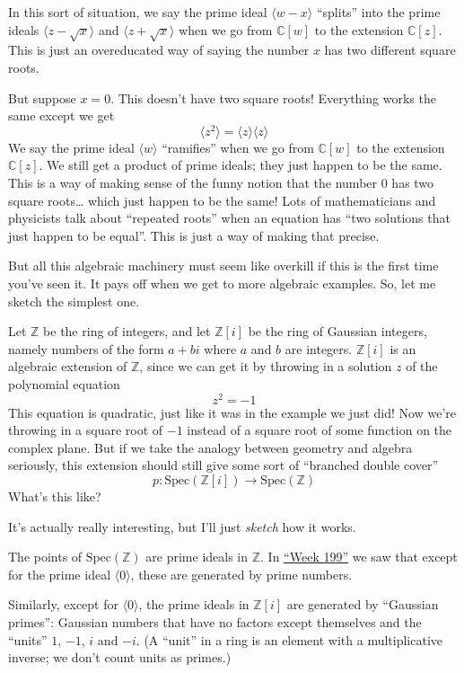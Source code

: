 \documentclass{article}
\begin{document}
In this sort of situation, we say the prime ideal
\(\langle w - x\rangle\) ``splits'' into the prime ideals
\(\langle z - \sqrt{x}\rangle\) and \(\langle z + \sqrt{x}\rangle\) when
we go from \(\mathbb{C}[w]\) to the extension \(\mathbb{C}[z]\). This is
just an overeducated way of saying the number \(x\) has two different
square roots.

But suppose \(x = 0\). This doesn't have two square roots! Everything
works the same except we get
\[\langle z^2\rangle = \langle z\rangle \langle z\rangle\] We say the
prime ideal \(\langle w\rangle\) ``ramifies'' when we go from
\(\mathbb{C}[w]\) to the extension \(\mathbb{C}[z]\). We still get a
product of prime ideals; they just happen to be the same. This is a way
of making sense of the funny notion that the number \(0\) has two square
roots\ldots{} which just happen to be the same! Lots of mathematicians
and physicists talk about ``repeated roots'' when an equation has ``two
solutions that just happen to be equal''. This is just a way of making
that precise.

But all this algebraic machinery must seem like overkill if this is the
first time you've seen it. It pays off when we get to more algebraic
examples. So, let me sketch the simplest one.

Let \(\mathbb{Z}\) be the ring of integers, and let \(\mathbb{Z}[i]\) be
the ring of Gaussian integers, namely numbers of the form \(a+bi\) where
\(a\) and \(b\) are integers. \(\mathbb{Z}[i]\) is an algebraic
extension of \(\mathbb{Z}\), since we can get it by throwing in a
solution \(z\) of the polynomial equation \[z^2 = -1\] This equation is
quadratic, just like it was in the example we just did! Now we're
throwing in a square root of \(-1\) instead of a square root of some
function on the complex plane. But if we take the analogy between
geometry and algebra seriously, this extension should still give some
sort of ``branched double cover''
\[p\colon \mathrm{Spec}(\mathbb{Z}[i]) \to \mathrm{Spec}(\mathbb{Z})\]
What's this like?

It's actually really interesting, but I'll just \emph{sketch} how it
works.

The points of \(\mathrm{Spec}(\mathbb{Z})\) are prime ideals in
\(\mathbb{Z}\). In \protect\hyperlink{week199}{``Week 199''} we saw that
except for the prime ideal \(\langle 0\rangle\), these are generated by
prime numbers.

Similarly, except for \(\langle 0\rangle\), the prime ideals in
\(\mathbb{Z}[i]\) are generated by ``Gaussian primes'': Gaussian numbers
that have no factors except themselves and the ``units'' \(1\), \(-1\),
\(i\) and \(-i\). (A ``unit'' in a ring is an element with a
multiplicative inverse; we don't count units as primes.)
\end{document}
